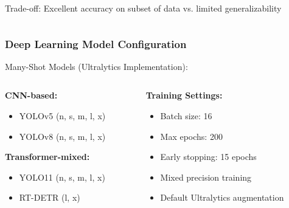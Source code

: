 \documentclass[aspectratio=43]{beamer}
\begin{document}
\begin{frame}
\begin{columns}
\begin{column}{0.5\textwidth}
            \begin{alertblock}{\small Trade-off:}
                Excellent accuracy on subset of data vs. limited generalizability
            \end{alertblock}
        \end{column}
    \end{columns}
\end{frame}

\begin{frame}
    \frametitle{Deep Learning Model Configuration}
    
    \begin{block}{Many-Shot Models (Ultralytics Implementation):}
        \small
        \begin{columns}
            \begin{column}{0.5\textwidth}
                \textbf{CNN-based:}
                \begin{itemize}
                    \item YOLOv5 (n, s, m, l, x)
                    \item YOLOv8 (n, s, m, l, x)
                \end{itemize}
                
                \textbf{Transformer-mixed:}
                \begin{itemize}
                    \item YOLO11 (n, s, m, l, x)
                    \item RT-DETR (l, x)
                \end{itemize}
            \end{column}
            
            \begin{column}{0.5\textwidth}
                \textbf{Training Settings:}
                \begin{itemize}
                    \item Batch size: 16
                    \item Max epochs: 200
                    \item Early stopping: 15 epochs
                    \item Mixed precision training
                    \item Default Ultralytics augmentation
                \end{itemize}
            \end{column}
        \end{columns}
    \end{block}
    

\end{frame}
\end{document}
